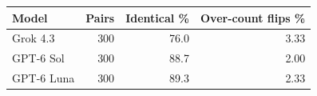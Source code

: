 \begin{tabular}{lrrr}
  \toprule
  Model & Pairs & Identical \% & Over-count flips \% \\
  \midrule
  Grok 4.3 & 300 & 76.0 & 3.33 \\
  GPT-6 Sol & 300 & 88.7 & 2.00 \\
  GPT-6 Luna & 300 & 89.3 & 2.33 \\
  \bottomrule
\end{tabular}

